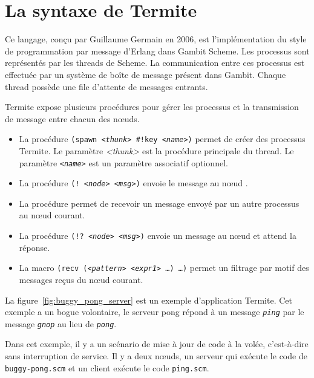 \section{La syntaxe de Termite}
\label{sec:termite_syntax}

Ce langage, conçu par Guillaume Germain en 2006, est l'implémentation du style
de programmation par message d'Erlang dans Gambit Scheme.  Les processus sont
représentés par les threads de Scheme. La communication entre ces processus est
effectuée par un système de boîte de message présent dans Gambit. Chaque thread
possède une file d'attente de messages entrants.

Termite expose plusieurs procédures pour gérer les processus et la transmission
de message entre chacun des nœuds.

\begin{itemize}
  \item La procédure \texttt{(spawn~\textit{<thunk>} \#!key \textit{<name>})} permet de
    créer des processus Termite. Le paramètre \textit{<thunk>} est la procédure principale
    du thread. Le paramètre \texttt{\itshape <name>} est un paramètre associatif optionnel.

  \item La procédure \texttt{(!~{\itshape{<node>}} {\itshape <msg>})} envoie le message
     au nœud .

  \item La procédure  permet de recevoir un message
    envoyé par un autre processus au nœud courant.

  \item La procédure \texttt{(!?~\textit{<node>} \textit{<msg>})} envoie un message au
    nœud  et attend la réponse.

  \item La macro \texttt{(recv (\textit{<pattern>} \textit{<expr1>} \dots) \dots)}
    permet un filtrage par motif des messages reçus du nœud courant.

\end{itemize}

La figure~\ref{fig:buggy_pong_server} est un exemple d'application Termite.
Cet exemple a un bogue volontaire, le serveur pong répond à un message
\texttt{\itshape ping} par le message \texttt{\itshape gnop} au lieu de
\texttt{\itshape pong}.

Dans cet exemple, il y a un scénario de mise à jour de code à la volée,
c'est-à-dire sans interruption de service. Il y a deux nœuds, un serveur
qui exécute le code de \texttt{buggy-pong.scm} et un client exécute le
code \texttt{ping.scm}.

